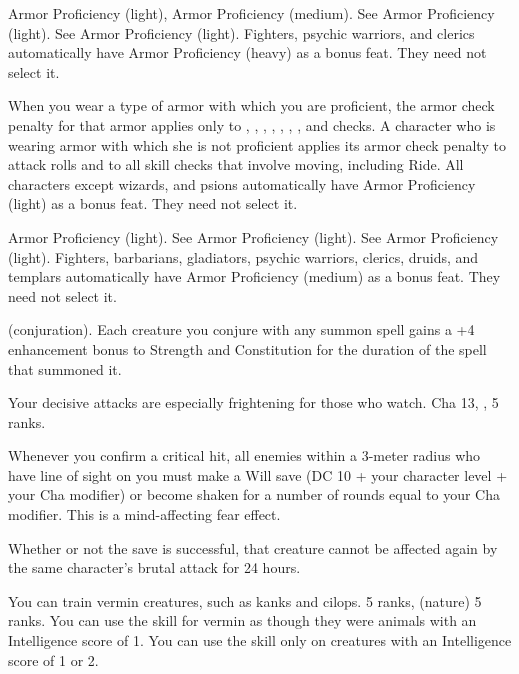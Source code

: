 {}
{Armor Proficiency (light), Armor Proficiency (medium).}
{See Armor Proficiency (light).}
{See Armor Proficiency (light).}
{Fighters, psychic warriors, and clerics automatically have Armor Proficiency (heavy) as a bonus feat. They need not select it.}

{}{}
{When you wear a type of armor with which you are proficient, the armor check penalty for that armor applies only to , , , , , , , and  checks.}
{A character who is wearing armor with which she is not proficient applies its armor check penalty to attack rolls and to all skill checks that involve moving, including Ride.}
{All characters except wizards, and psions automatically have Armor Proficiency (light) as a bonus feat. They need not select it.}

{}
{Armor Proficiency (light).}
{See Armor Proficiency (light).}
{See Armor Proficiency (light).}
{Fighters, barbarians, gladiators, psychic warriors, clerics, druids, and templars automatically have Armor Proficiency (medium) as a bonus feat. They need not select it.}

{ (conjuration).}
{Each creature you conjure with any summon spell gains a +4 enhancement bonus to Strength and Constitution for the duration of the spell that summoned it.}

{Your decisive attacks are especially frightening for those who watch.}
{Cha 13, ,  5 ranks.}
{Whenever you confirm a critical hit, all enemies within a 3-meter radius who have line of sight on you must make a Will save (DC 10 + \onehalf your character level + your Cha modifier) or become shaken for a
number of rounds equal to your Cha modifier. This is a mind-affecting fear effect.

Whether or not the save is successful, that creature cannot be affected again by the same character's brutal
attack for 24 hours.}{}{}

{You can train vermin creatures, such as kanks and cilops.}
{ 5 ranks,  (nature) 5 ranks.}
{You can use the  skill for vermin as though they were animals with an Intelligence score of 1.}
{You can use the  skill only on creatures with an Intelligence score of 1 or 2.}
{}

